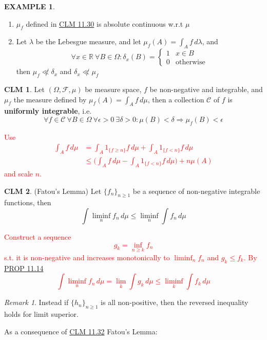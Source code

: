 \documentclass[hidelinks]{article}
\theoremstyle{definition}
\newtheorem*{eg}{EXAMPLE}
\theoremstyle{dotless}
\newtheorem{claim}{CLM}[section]
\theoremstyle{remark}
\newtheorem*{remark}{Remark}
\begin{document}
\begin{eg}~
\begin{enumerate}[label=\arabic*\degree]
    \item $\mu_f$ defined in \hyperref[CLM 11.30]{CLM 11.30} is absolute continuous w.r.t $\mu$
    \item Let $\lambda$ be the Lebesgue measure, and let $\mu_f(A)=\int_Af\,d\lambda$, and
    \[\forall x\in\mathbb{R}\ \forall B\in\Omega:\delta_x(B)=\begin{cases}
      1 & x\in B\\
      0 & \textrm{otherwise}
    \end{cases}\]
    then $\mu_f\not\ll\delta_x$ and $\delta_x\not\ll\mu_f$
\end{enumerate}
\end{eg}

\begin{claim}
Let $(\Omega,\mathscr{F},\mu)$ be measure space, $f$ be non-negative and integrable, and $\mu_f$ the measure defined by $\mu_f(A)=\int_Af\,d\mu$, then a collection $\mathscr{C}$ of $f$ is \textbf{uniformly integrable}, i.e.
\[\forall f\in\mathscr{C}\ \forall B\in\Omega\ \forall\epsilon>0\ \exists\delta>0:\mu(B)<\delta\Rightarrow\mu_f(B)<\epsilon\]
\end{claim}
\textcolor{red}{Use
\begin{align*}
\int_Af\,d\mu&=\int_A1_{\{f\geq n\}}f\,d\mu+\int_A1_{\{f<n\}}f\,d\mu\\&\leq\Big(\int_Af\,d\mu-\int_A1_{\{f<n\}}f\,d\mu\bigg)+n\mu(A)
\end{align*}
and scale $n$.}

\begin{claim}\label{CLM 11.32}(Fatou's Lemma) Let $\{f_n\}_{n\geq1}$ be a sequence of non-negative integrable functions, then
\[\int\liminf_nf_n\,d\mu\leq\liminf_n\int f_n\,d\mu\]
\end{claim}
\textcolor{red}{Construct a sequence
\[g_k=\inf_{n\geq k}f_n\]
s.t. it is non-negative and increases monotonically to $\liminf_n f_n$ and $g_k\leq f_k$. By \hyperref[PROP 11.14]{PROP 11.14}
\[\int\liminf_nf_n\,d\mu=\lim_k\int g_k\,d\mu\leq\liminf_k\int f_k\,d\mu\]}

\begin{remark}
Instead if $\{h_n\}_{n\geq1}$ is all non-positive, then the reversed inequality holds for limit superior.
\end{remark}

\bigbreak

As a consequence of \hyperref[CLM 11.32]{CLM 11.32} Fatou's Lemma:
\end{document}
